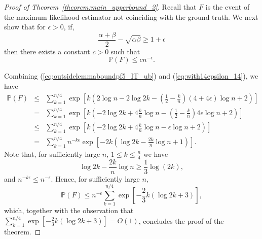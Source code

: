 \documentclass[english]{article}
\newtheorem{lemma}{Lemma}
\newcommand{\1}{\textbf{1}}
\newcommand{\p}{\mathbb{P}}
\begin{document}
\begin{proof}[Proof of Theorem~\ref{theorem:main_upperbound_2}]
Recall that $F$ is the event of the maximum likelihood estimator not coinciding with the ground truth. We next show that for $\epsilon>0$, if,
\[
\frac{\alpha+\beta}{2} -\sqrt{\alpha \beta} \geq 1+\epsilon
\]
then there exists a constant $c>0$ such that
\begin{equation}\label{eq:with14epsilon_14}
\p(F) \leq cn^{-\epsilon}.
\end{equation}

Combining (\ref{eq:outsidelemmaboundpf5_IT_ub}) and (\ref{eq:with14epsilon_14}), we have
\begin{eqnarray}
\p(F) & \leq &  \sum_{k=1}^{n/4}  \exp\left[k\left( 2 \log n - 2\log 2k - \left(\frac{1}2-\frac{k}n\right) \left( 4+4\epsilon \right) \log n +2\right)\right]\nonumber\\
& = &  \sum_{k=1}^{n/4}  \exp\left[k\left(  - 2\log 2k +  4\frac{k}n\log n - \left(\frac{1}2-\frac{k}n\right) 4\epsilon \log n+2 \right)\right]\nonumber\\
& \leq &  \sum_{k=1}^{n/4}  \exp\left[k\left(  - 2\log 2k +  4\frac{k}n\log n - \epsilon \log n+2 \right)\right]\\
& = &  \sum_{k=1}^{n/4} n^{-k\epsilon} \exp\left[-2k\left( \log 2k -  \frac{2k}n\log n +1 \right)\right].\nonumber
\end{eqnarray}
Note that, for sufficiently large $n$, $1\leq k\leq \frac{n}4$ we have
\[
\log 2k -  \frac{2k}n\log n \geq \frac13 \log(2k),
\]
and $ n^{-k\epsilon} \leq n^{-\epsilon}$.
Hence, for sufficiently large $n$,
\[
\p(F) \leq n^{-\epsilon}\sum_{k=1}^{n/4} \exp\left[-\frac23k\left(\log 2k + 3\right)\right],
\]
which, together with the observation that $\sum_{k=1}^{n/4} \exp\left[-\frac23k\left(\log 2k + 3\right)\right] = O(1)$, concludes the proof of the theorem.
\end{proof}
\end{document}
